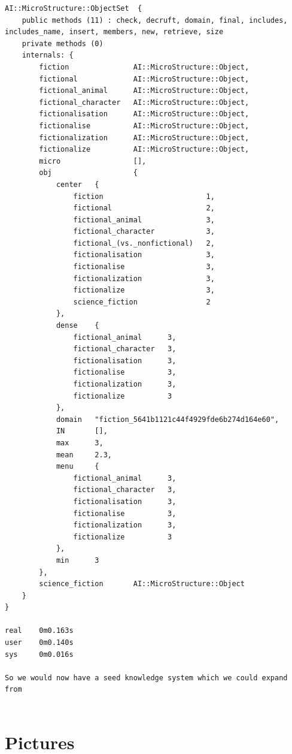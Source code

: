 \documentclass[11pt]{article}
\begin{document}
          \begin{verbatim}
AI::MicroStructure::ObjectSet  {
    public methods (11) : check, decruft, domain, final, includes, includes_name, insert, members, new, retrieve, size
    private methods (0)
    internals: {
        fiction               AI::MicroStructure::Object,
        fictional             AI::MicroStructure::Object,
        fictional_animal      AI::MicroStructure::Object,
        fictional_character   AI::MicroStructure::Object,
        fictionalisation      AI::MicroStructure::Object,
        fictionalise          AI::MicroStructure::Object,
        fictionalization      AI::MicroStructure::Object,
        fictionalize          AI::MicroStructure::Object,
        micro                 [],
        obj                   {
            center   {
                fiction                        1,
                fictional                      2,
                fictional_animal               3,
                fictional_character            3,
                fictional_(vs._nonfictional)   2,
                fictionalisation               3,
                fictionalise                   3,
                fictionalization               3,
                fictionalize                   3,
                science_fiction                2
            },
            dense    {
                fictional_animal      3,
                fictional_character   3,
                fictionalisation      3,
                fictionalise          3,
                fictionalization      3,
                fictionalize          3
            },
            domain   "fiction_5641b1121c44f4929fde6b274d164e60",
            IN       [],
            max      3,
            mean     2.3,
            menu     {
                fictional_animal      3,
                fictional_character   3,
                fictionalisation      3,
                fictionalise          3,
                fictionalization      3,
                fictionalize          3
            },
            min      3
        },
        science_fiction       AI::MicroStructure::Object
    }
}

real    0m0.163s
user    0m0.140s
sys     0m0.016s

So we would now have a seed knowledge system which we could expand from


          \end{verbatim}


\section{Pictures}
\end{document}
